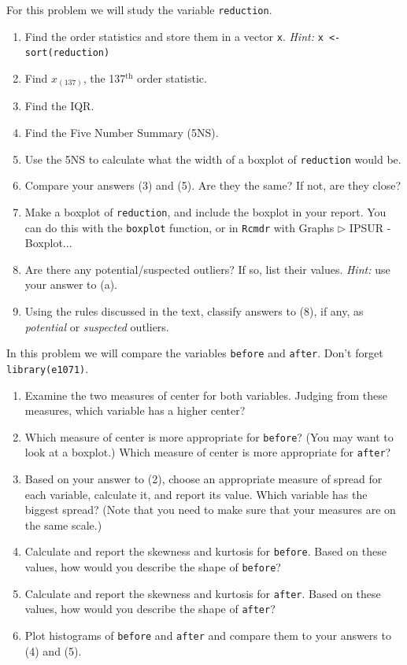 \documentclass[captions=tableheading]{scrbook}
\begin{document}
\begin{xca}
For this problem we will study the variable \texttt{reduction}.
\begin{enumerate}
\item Find the order statistics and store them in a vector \texttt{x}. \emph{Hint:} \texttt{x <- sort(reduction)}
\item Find \(x_{(137)}\), the 137\(^{\mathrm{th}}\) order statistic.
\item Find the IQR.
\item Find the Five Number Summary (5NS).
\item Use the 5NS to calculate what the width of a boxplot of \texttt{reduction} would be.
\item Compare your answers (3) and (5). Are they the same? If not, are they close?
\item Make a boxplot of \texttt{reduction}, and include the boxplot in your report. You can do this with the \texttt{boxplot} function, or in \texttt{Rcmdr} with \textsf{Graphs} \textsf{\(\triangleright\)} \textsf{IPSUR - Boxplot}...
\item Are there any potential/suspected outliers? If so, list their values. \emph{Hint:} use your answer to (a).
\item Using the rules discussed in the text, classify answers to (8), if any, as \emph{potential} or \emph{suspected} outliers.
\end{enumerate}
\end{xca}

\begin{xca}
In this problem we will compare the variables \texttt{before} and \texttt{after}. Don't forget \texttt{library(e1071)}.
\begin{enumerate}
\item Examine the two measures of center for both variables. Judging from these measures, which variable has a higher center?
\item Which measure of center is more appropriate for \texttt{before}? (You may want to look at a boxplot.) Which measure of center is more appropriate for \texttt{after}?
\item Based on your answer to (2), choose an appropriate measure of spread for each variable, calculate it, and report its value. Which variable has the biggest spread? (Note that you need to make sure that your measures are on the same scale.)
\item Calculate and report the skewness and kurtosis for \texttt{before}. Based on these values, how would you describe the shape of \texttt{before}?
\item Calculate and report the skewness and kurtosis for \texttt{after}. Based on these values, how would you describe the shape of \texttt{after}?
\item Plot histograms of \texttt{before} and \texttt{after} and compare them to your answers to (4) and (5).
\end{enumerate}
\end{xca}
\end{document}

